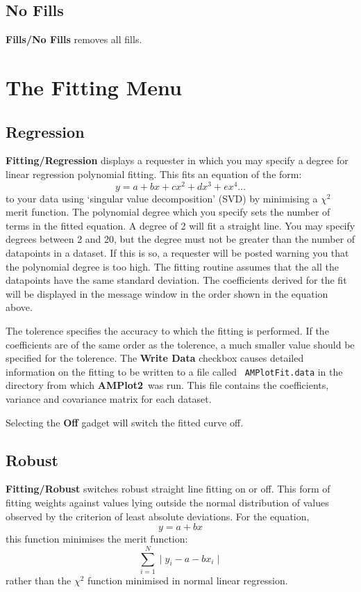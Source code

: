 \documentclass{report}
\newcommand{\amplot}{{\bf AMPlot2}}
\begin{document}
\subsection{No Fills}
{\bf Fills/No Fills} removes all fills.

\section{The Fitting Menu}


\subsection{Regression}
{\bf Fitting/Regression}  displays a requester in 
which you may specify a degree for linear regression polynomial fitting. 
This fits an equation of the form:
$$y=a+bx+cx^2+dx^3+ex^4\ldots$$
to your data using `singular value decomposition' (SVD) by minimising a $\chi^2$ 
merit function.
The polynomial degree which you specify sets the number of terms in 
the fitted equation. A degree of 2 will fit a straight line. You may specify 
degrees between 2 and 20, but the degree must not be greater than the number of 
datapoints in a dataset. If this is so, a requester will be posted warning you that 
the polynomial degree is too high.
The fitting routine assumes that the all the datapoints have the same
standard deviation. The coefficients derived for the fit will be displayed in the
message window in the order shown in the equation above.

The tolerence specifies the accuracy to which the fitting is performed. If 
the coefficients are of the same order as the tolerence, a much smaller 
value should be specified for the tolerence. The {\bf Write Data} checkbox 
causes detailed information on the fitting to be written to a file called 
{\tt
AMPlotFit.data} in the directory from which \amplot\ was run. This file contains the 
coefficients, variance and covariance matrix for each dataset. 

Selecting the {\bf Off} gadget will switch the fitted curve off.



\subsection{Robust}
{\bf Fitting/Robust} switches 
robust straight line fitting on or off. This form of 
fitting weights against values lying outside the normal distribution of values 
observed by the criterion of least absolute deviations. 
For the equation,
$$y = a + bx$$
this function minimises the merit function:
$$\sum_{i=1}^{N}\mid y_i-a-bx_i\mid$$
rather than the $\chi^2$ function minimised in normal linear regression.
\end{document}
